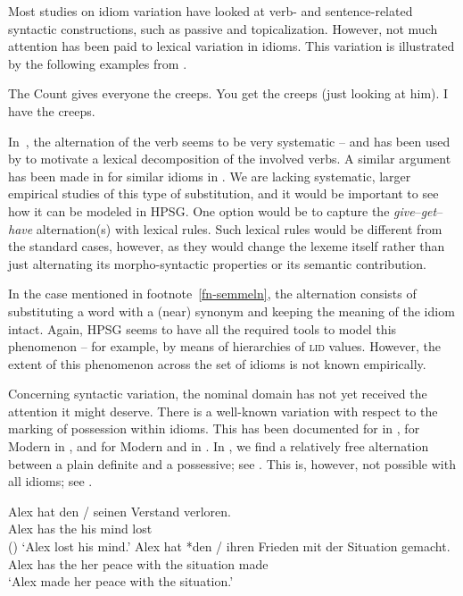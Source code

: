 \documentclass[output=paper,biblatex,babelshorthands,newtxmath,draftmode,colorlinks,citecolor=brown]{langscibook}
\begin{document}
Most studies on idiom variation have looked at verb- and sentence-related syntactic constructions,
such as passive and topicalization.  However, not much attention has been paid to lexical variation
in idioms. This variation is illustrated by the following examples from \citet[,
191]{Richards:01}.

\eal  \label{creeps}
\ex The Count gives everyone the creeps.
\ex You get the creeps (just looking at him).
\ex I have the creeps.
\zl 

\noindent
In~, the alternation of the verb seems to be very systematic -- and has been used by
\citet{Richards:01} to motivate a lexical decomposition of the involved verbs.  A similar argument has been
made in \citet{Mateu:Espinal:07} for similar idioms in .  We are lacking systematic,
larger empirical studies of this type of substitution, and it would be important to see how it can
be modeled in HPSG.  One option would be to capture the \emph{give}--\emph{get}--\emph{have}
alternation(s) with lexical rules. Such lexical rules would be different from the standard cases,
however, as they would change the lexeme itself rather than just alternating its morpho-syntactic
properties or its semantic contribution.

In the case mentioned in footnote~\ref{fn-semmeln}, the alternation consists of substituting a word
with a (near) synonym and keeping the meaning of the idiom intact. Again, HPSG seems to have all the
required tools to model this phenomenon -- for example, by means of hierarchies of
\textsc{lid} values.  However, the extent of this phenomenon across the set of idioms is not
known empirically.

Concerning syntactic variation, the nominal domain has not yet received the attention it might
deserve.  There is a well-known variation with respect to the marking of possession within idioms.
This has been documented for  in \citet{Ho:15}, for Modern
 in \citet{Almog:12}, and for Modern  and 
in \citet{Markantonatou:Sailer:16}.  In , we find a relatively free alternation between
a plain definite and a possessive; see . This is, however, not possible with all
idioms; see .

\eal \label{ex-verstand-herz}
\ex 
\gll Alex hat den / seinen Verstand verloren.\\
Alex has the {} his mind lost\\\hfill()
\glt `Alex lost his mind.'\label{ex-verstand}
\ex 
\gll Alex hat *den / ihren Frieden mit der Situation gemacht.\\
     Alex has \hphantom{*}the {} her peace with the situation made\\
\glt `Alex made her peace with the situation.'\label{ex-frieden}
\zl 
\end{document}

